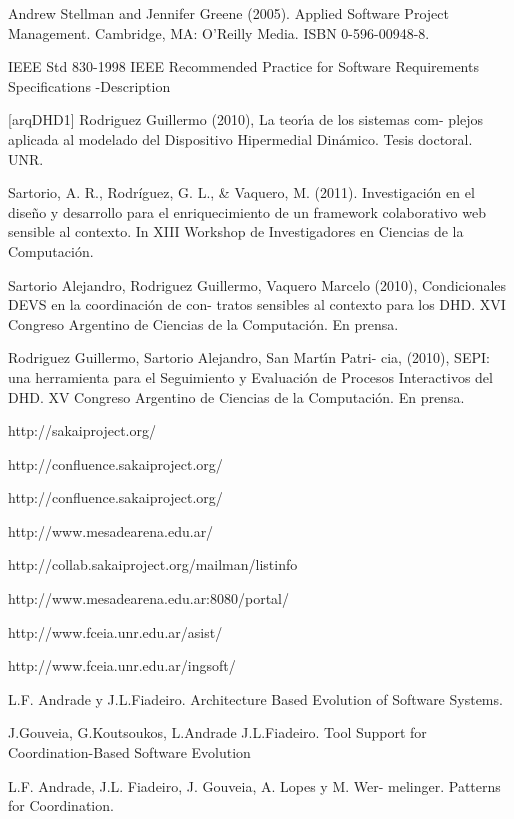 \begin{thebibliography}{1}
{ Andrew Stellman and Jennifer Greene (2005). Applied
Software Project Management. Cambridge, MA: O'Reilly Media. ISBN 0-596-00948-8.


IEEE Std 830-1998 IEEE Recommended Practice for Software
Requirements Specifications -Description


[arqDHD1] Rodriguez Guillermo (2010), La teorı́a de los sistemas com-
plejos aplicada al modelado del Dispositivo Hipermedial
Dinámico. Tesis doctoral. UNR.

Sartorio, A. R., Rodríguez, G. L., & Vaquero, M. (2011). Investigación en el diseño y desarrollo para el enriquecimiento de un framework colaborativo web sensible al contexto. In XIII Workshop de Investigadores en Ciencias de la Computación.



Sartorio Alejandro, Rodriguez Guillermo, Vaquero Marcelo
(2010), Condicionales DEVS en la coordinación de con-
tratos sensibles al contexto para los DHD. XVI Congreso
Argentino de Ciencias de la Computación. En prensa.

Rodriguez Guillermo, Sartorio Alejandro, San Martı́n Patri-
cia, (2010), SEPI: una herramienta para el Seguimiento y
Evaluación de Procesos Interactivos del DHD. XV Congreso
Argentino de Ciencias de la Computación. En prensa.

http://sakaiproject.org/

http://confluence.sakaiproject.org/


http://confluence.sakaiproject.org/

http://www.mesadearena.edu.ar/

http://collab.sakaiproject.org/mailman/listinfo

http://www.mesadearena.edu.ar:8080/portal/

http://www.fceia.unr.edu.ar/asist/

http://www.fceia.unr.edu.ar/ingsoft/

L.F. Andrade y J.L.Fiadeiro. Architecture Based Evolution
of Software Systems.

J.Gouveia, G.Koutsoukos, L.Andrade J.L.Fiadeiro. Tool
Support for Coordination-Based Software Evolution

L.F. Andrade, J.L. Fiadeiro, J. Gouveia, A. Lopes y M. Wer-
melinger. Patterns for Coordination.

}
\end{thebibliography}
